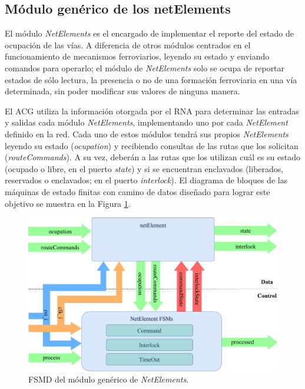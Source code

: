 \subsection{Módulo genérico de los netElements}
	\label{sec:ACG_net}
	
	El módulo \textit{NetElements} es el encargado de implementar el reporte del estado de ocupación de las vías. A diferencia de otros módulos centrados en el funcionamiento de mecanismos ferroviarios, leyendo su estado y enviando comandos para operarlo; el módulo de \textit{NetElements} solo se ocupa de reportar estados de sólo lectura, la presencia o no de una formación ferroviaria en una vía determinada, sin poder modificar sus valores de ninguna manera.
	
	El ACG utiliza la información otorgada por el RNA para determinar las entradas y salidas cada módulo \textit{NetElements}, implementando uno por cada \textit{NetElement} definido en la red. Cada uno de estos módulos tendrá sus propios \textit{NetElements} leyendo su estado (\textit{ocupation}) y recibiendo consultas de las rutas que los solicitan (\textit{routeCommands}). A su vez, deberán a las rutas que los utilizan cuál es su estado (ocupado o libre, en el puerto \textit{state}) y si se encuentran enclavados (liberados, reservados o enclavados; en el puerto \textit{interlock}). El diagrama de bloques de las máquinas de estado finitas con camino de datos diseñado para lograr este objetivo se muestra en la Figura \ref{fig:NET_module}.
	
	\begin{figure}[H]
		\centering
		\includegraphics[width=1\textwidth]{Figuras/NET_module}
		\centering\caption{FSMD del módulo genérico de \textit{NetElements}.}
		\label{fig:NET_module}
	\end{figure}
	
